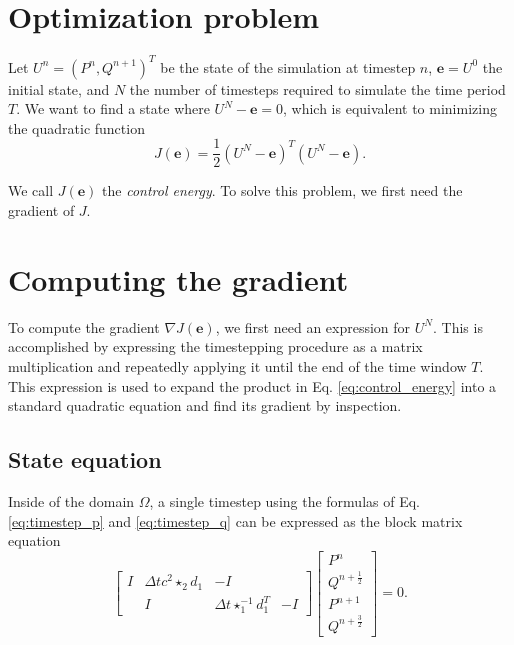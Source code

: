 \documentclass[utf8,english]{gradu3}
\begin{document}
\section{Optimization problem}

Let $U^n = (P^n, Q^{n+1})^T$ be the state of the simulation at timestep $n$,
$\mathbf{e} = U^0$ the initial state, and $N$ the number of timesteps
required to simulate the time period $T$.
We want to find a state where $U^N - \mathbf{e} = 0$,
which is equivalent to minimizing the quadratic function
\begin{equation}\label{eq:control_energy}
  J(\mathbf{e}) = \frac{1}{2}(U^N - \mathbf{e})^T (U^N - \mathbf{e}).
\end{equation}

We call $J(\mathbf{e})$ the \textit{control energy}.
To solve this problem, we first need the gradient of $J$.


\section{Computing the gradient}

To compute the gradient $\nabla J(\mathbf{e})$,
we first need an expression for $U^N$.
This is accomplished by expressing the timestepping procedure
as a matrix multiplication and repeatedly applying it
until the end of the time window $T$.
This expression is used to expand the product in Eq. \eqref{eq:control_energy}
into a standard quadratic equation and find its gradient by inspection.


\subsection{State equation}

Inside of the domain $\Omega$, a single timestep
using the formulas of Eq. \eqref{eq:timestep_p} and \eqref{eq:timestep_q}
can be expressed as the block matrix equation
\[
  \begin{bmatrix}
  I & \Delta t c^2 \star_2 d_1 & -I \\
  & I & \Delta t \star_1^{-1} d_1^T & -I
  \end{bmatrix}
  \begin{bmatrix}
  P^n \\ Q^{n+\frac{1}{2}} \\ P^{n+1} \\ Q^{n+\frac{3}{2}}
  \end{bmatrix}
  = 0.
\]
\end{document}
